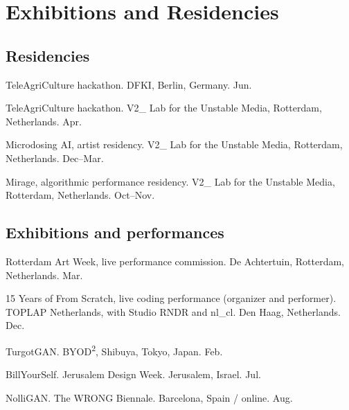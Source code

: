 \documentclass[11pt,letterpaper]{report} %
\begin{document}
\section*{Exhibitions and Residencies}

\subsection*{Residencies}

\begin{tablist}

\item[2026]     \tab{}TeleAgriCulture hackathon. DFKI, Berlin, Germany. Jun.

\item[2026]     \tab{}TeleAgriCulture hackathon. V2\_ Lab for the Unstable Media, Rotterdam, Netherlands. Apr.

\item[2025--26] \tab{}Microdosing AI, artist residency. V2\_ Lab for the Unstable Media, Rotterdam, Netherlands. Dec--Mar.

\item[2025]     \tab{}Mirage, algorithmic performance residency. V2\_ Lab for the Unstable Media, Rotterdam, Netherlands. Oct--Nov.

\end{tablist}

\subsection*{Exhibitions and performances}

\begin{tablist}

\item[2026] \tab{}Rotterdam Art Week, live performance commission. De Achtertuin, Rotterdam, Netherlands. Mar.

\item[2025] \tab{}15 Years of From Scratch, live coding performance (organizer and performer). TOPLAP Netherlands, with Studio RNDR and nl\_cl. Den Haag, Netherlands. Dec.

\item[2025] \tab{}TurgotGAN. BYOD\textsuperscript{2}, Shibuya, Tokyo, Japan. Feb.

\item[2023] \tab{}BillYourSelf. Jerusalem Design Week. Jerusalem, Israel. Jul.

\item[2021] \tab{}NolliGAN. The WRONG Biennale. Barcelona, Spain / online. Aug.

\end{tablist}
\end{document}
